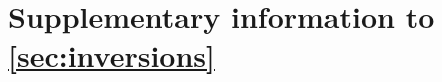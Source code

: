 \chapter{Supplementary information to \texorpdfstring{\cref{sec:inversions}}{the complex inversion project}}
\label{sec:suppl_inversions}


